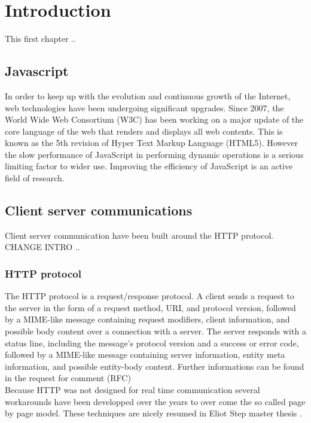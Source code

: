\chapter{Introduction}
\label{Chapter1}

This first chapter ..\\

\section{Javascript}

In order to keep up with the evolution and continuous growth of the Internet,
web technologies have been undergoing significant upgrades. Since 2007, the
World Wide Web Consortium (W3C) has been working on a major update of the core
language of the web that renders and displays all web contents. This is known
as the 5th revision of Hyper Text Markup Language (HTML5).  However the slow
performance of JavaScript in performing dynamic operations is a serious
limiting factor to wider use. Improving the efficiency of JavaScript is an
active field of research.\\

\section{Client server communications}

Client  server communication have been built around the HTTP protocol. CHANGE
INTRO ..\\

\subsection{HTTP protocol}

The HTTP protocol is a request/response protocol. A client sends a request to
the server in the form of a request method, URI, and protocol version, followed
by a MIME-like message containing request modifiers, client information, and
possible body content over a connection with a server. The server responds with
a status line, including the message's protocol version and a success or error
code, followed by a MIME-like message containing server information, entity
meta information, and possible entity-body content. Further informations can be
found in the request for comment (RFC) \citep{Reference1}\\

Because HTTP was not designed for real time communication several workarounds
have been developped over the years to over come the so called page by page
model. These techniques are nicely resumed in Eliot Step master thesis
\citep{Reference2}.


